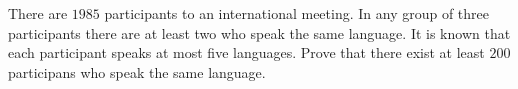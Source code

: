 There are $1985$ participants to an international meeting. In any group of three participants there are at least two who speak the same language. It is known that each participant speaks at most five languages. Prove that there exist at least $200$ participans who speak the same language.